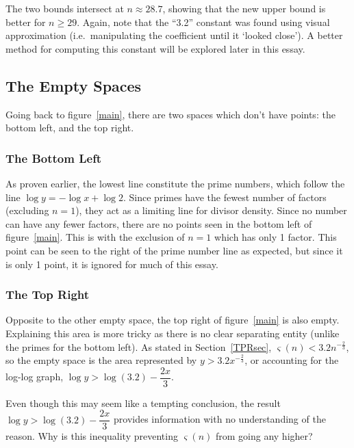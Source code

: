 \documentclass[12pt]{article}
\begin{document}
			The two bounds intersect at $n\approx 28.7$, showing that the new upper bound is better for $n\geq 29$. Again, note that the ``3.2'' constant was found using visual approximation (i.e.\ manipulating the coefficient until it `looked close'). A better method for computing this constant will be explored later in this essay.
		\subsection{The Empty Spaces}
			Going back to figure~\ref{main}, there are two spaces which don't have points: the bottom left, and the top right.
			\subsubsection{The Bottom Left}
				As proven earlier, the lowest line constitute the prime numbers, which follow the line $\log y=-\log x+\log 2$. Since primes have the fewest number of factors (excluding $n=1$), they act as a limiting line for divisor density. Since no number can have any fewer factors, there are no points seen in the bottom left of figure~\ref{main}. This is with the exclusion of $n=1$ which has only 1 factor. This point can be seen to the right of the prime number line as expected, but since it is only 1 point, it is ignored for much of this essay.
			\subsubsection{The Top Right}
				Opposite to the other empty space, the top right of figure~\ref{main} is also empty. Explaining this area is more tricky as there is no clear separating entity (unlike the primes for the bottom left). As stated in Section~\ref{TPRsec}, $\varsigma(n)< 3.2n^{-\frac{2}{3}}$, so the empty space is the area represented by $y> 3.2x^{-\frac{2}{3}}$, or accounting for the log-log graph, $\log y> \log(3.2)-\dfrac{2x}{3}$.
				
				Even though this may seem like a tempting conclusion, the result $\log y> \log(3.2)-\dfrac{2x}{3}$ provides information with no understanding of the reason. Why is this inequality preventing $\varsigma(n)$ from going any higher?
\end{document}
